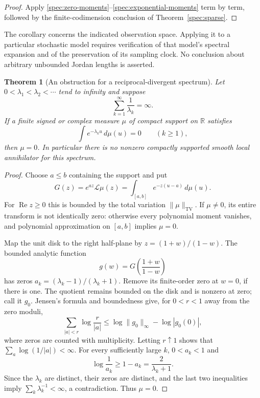 \documentclass[11pt]{article}
\newtheorem{theorem}{Theorem}[section]
\theoremstyle{definition}
\theoremstyle{remark}
\numberwithin{equation}{section}
\begin{document}
\begin{proof}
Apply \eqref{spec:zero-moments}--\eqref{spec:exponential-moments}
term by term, followed by the finite-codimension conclusion of
Theorem~\ref{spec:sparse}.
\end{proof}

The corollary concerns the indicated observation space. Applying it
to a particular stochastic model requires verification of that
model's spectral expansion and of the preservation of its sampling
clock. No conclusion about arbitrary unbounded Jordan lengths is
asserted.

\begin{theorem}[An obstruction for a reciprocal-divergent spectrum]
\label{spec:divergent}
Let $0<\lambda_1<\lambda_2<\cdots$ tend to infinity and suppose
\[
                         \sum_{k=1}^{\infty}\frac1{\lambda_k}
                                  =\infty.
\]
If a finite signed or complex measure $\mu$ of compact support on
$\mathbb R$ satisfies
\[
                     \int e^{-\lambda_k u}\,d\mu(u)=0
                                  \qquad(k\ge1),
\]
then $\mu=0$. In particular there is no nonzero compactly supported
smooth local annihilator for this spectrum.
\end{theorem}

\begin{proof}
Choose $a\le b$ containing the support and put
\[
 G(z)=e^{az}\mathcal L\mu(z)
     =\int_{[a,b]}e^{-z(u-a)}\,d\mu(u).
\]
For $\operatorname{Re}z\ge0$ this is bounded by the total variation
$\|\mu\|_{\mathrm{TV}}$. If $\mu\ne0$, its entire transform is
not identically zero: otherwise every polynomial moment vanishes,
and polynomial approximation on $[a,b]$ implies $\mu=0$.

Map the unit disk to the right half-plane by
$z=(1+w)/(1-w)$. The bounded analytic function
\[
                         g(w)=G\left(\frac{1+w}{1-w}\right)
\]
has zeros
$a_k=(\lambda_k-1)/(\lambda_k+1)$. Remove its finite-order zero
at $w=0$, if there is one. The quotient remains bounded on the
disk and is nonzero at zero; call it $g_0$.
Jensen's formula and boundedness give, for $0<r<1$ away from the
zero moduli,
\[
 \sum_{|a|<r}\log\frac r{|a|}
 \le \log\|g_0\|_\infty-\log|g_0(0)|,
\]
where zeros are counted with multiplicity. Letting $r\uparrow1$
shows that $\sum_a\log(1/|a|)<\infty$.
For every sufficiently large $k$, $0<a_k<1$ and
\[
 \log\frac1{a_k}\ge1-a_k=\frac2{\lambda_k+1}.
\]
Since the $\lambda_k$ are distinct, their zeros are distinct, and
the last two inequalities imply $\sum_k\lambda_k^{-1}<\infty$,
a contradiction. Thus $\mu=0$.
\end{proof}
\end{document}

